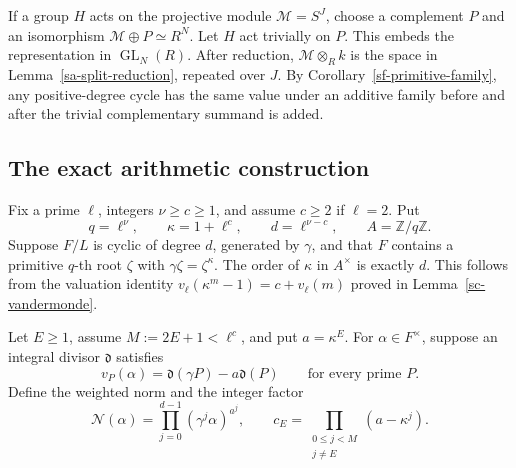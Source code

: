 If a group \(H\) acts on the projective module
\(\mathcal M=S^J\), choose a complement \(P\) and
an isomorphism \(\mathcal M\oplus P\simeq R^N\).
Let \(H\) act trivially on \(P\).
This embeds the representation in \(\operatorname{GL}_N(R)\).
After reduction, \(\mathcal M\otimes_R k\) is the
space in Lemma~\ref{sa-split-reduction}, repeated
over \(J\).
By Corollary~\ref{sf-primitive-family}, any positive-degree
cycle has the same value under an additive family
before and after the trivial complementary summand
is added.

\subsection{The exact arithmetic construction}

Fix a prime \(\ell\), integers \(\nu\ge c\ge1\),
and assume \(c\ge2\) if \(\ell=2\).
Put
\[
 q=\ell^\nu,\qquad \kappa=1+\ell^c,
 \qquad d=\ell^{\nu-c},\qquad A=\mathbb Z/q\mathbb Z.
\]
Suppose \(F/L\) is cyclic of degree \(d\), generated
by \(\gamma\), and that \(F\) contains a primitive
\(q\)-th root \(\zeta\) with
\(\gamma\zeta=\zeta^\kappa\).
The order of \(\kappa\) in \(A^\times\) is exactly
\(d\).  This follows from the valuation identity
\(v_\ell(\kappa^m-1)=c+v_\ell(m)\) proved in
Lemma~\ref{sc-vandermonde}.

Let \(E\ge1\), assume \(M:=2E+1<\ell^c\), and put
\(a=\kappa^E\).
For \(\alpha\in F^\times\), suppose an integral
divisor \(\mathfrak d\) satisfies
\[
       v_P(\alpha)=\mathfrak d(\gamma P)
                                     -a\mathfrak d(P)
                   \qquad\text{for every prime }P.
\]
Define the weighted norm and the integer factor
\[
 \mathcal N(\alpha)=\prod_{j=0}^{d-1}(\gamma^j\alpha)^{a^j},
 \qquad
 c_E=\prod_{\substack{0\le j<M\\j\ne E}}(a-\kappa^j).
\]

